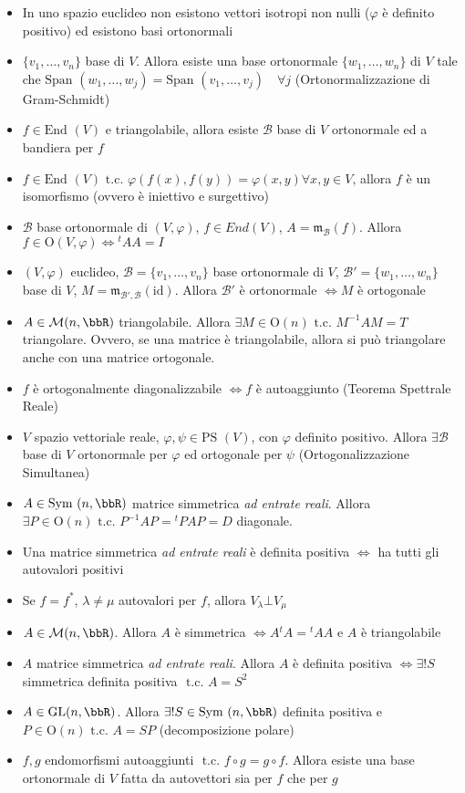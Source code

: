 \documentclass[a4paper,NoNotes]{stdmdoc}
\newcommand{\tc}{\mbox{ t.c. }}
\newcommand{\End}{\mbox{End }}
\newcommand{\GL}{\mbox{GL}}
\newcommand{\Ort}{\mbox{O}}
\newcommand{\Span}{\mbox{Span }}
\newcommand{\Symm}{\mbox{Sym }}
\newcommand{\Id}{\mbox{id}}
\newcommand{\PS}{\mbox{PS }}
\newcommand{\Mtr}{\mathfrak{m}}
\newcommand{\sse}{\Leftrightarrow}
\begin{document}
	\begin{itemize}
		\item In uno spazio euclideo non esistono vettori isotropi non nulli ($\varphi$ è definito positivo) ed esistono basi ortonormali
		\item $\{v_1, \ldots, v_n\}$ base di $V$. Allora esiste una base ortonormale $\{w_1, \ldots, w_n\}$ di $V$ tale che $\Span(w_1, \ldots, w_j) = \Span(v_1, \ldots, v_j) \quad \forall j$ (Ortonormalizzazione di Gram-Schmidt)
		\item $f \in \End(V)$ e triangolabile, allora esiste $\mathcal{B}$ base di $V$ ortonormale ed a bandiera per $f$
		\item $f \in \End(V) \tc \varphi(f(x), f(y)) = \varphi(x, y) \forall x, y \in V$, allora $f$ è un isomorfismo (ovvero è iniettivo e surgettivo)
		\item $\mathcal{B}$ base ortonormale di $(V, \varphi)$, $f \in End(V)$, $A = \Mtr_{\mathcal{B}}(f)$. Allora $f \in \Ort(V, \varphi) \sse {}^tA A = I$
		\item $(V, \varphi)$ euclideo, $\mathcal{B} = \{v_1, \ldots, v_n\}$ base ortonormale di $V$, $\mathcal{B'} = \{w_1, \ldots, w_n\}$ base di $V$, $M = \Mtr_{\mathcal{B'}, \mathcal{B}}(\Id)$. Allora $\mathcal{B'}$ è ortonormale $\sse M$ è ortogonale
		\item $A \in \mathcal{M}(n,\bbR)$ triangolabile. Allora $\exists M \in \Ort(n) \tc M^{-1}AM = T$ triangolare. Ovvero, se una matrice è triangolabile, allora si può triangolare anche con una matrice ortogonale.
		\item $f$ è ortogonalmente diagonalizzabile $\sse f$ è autoaggiunto (Teorema Spettrale Reale)
		\item $V$ spazio vettoriale reale, $\varphi, \psi \in \PS(V)$, con $\varphi$ definito positivo. Allora $\exists \mathcal{B}$ base di $V$ ortonormale per $\varphi$ ed ortogonale per $\psi$ (Ortogonalizzazione Simultanea)
		\item $A \in \Symm(n, \bbR)$ matrice simmetrica {\it ad entrate reali}. Allora $\exists P \in \Ort(n) \tc P^{-1}AP = {}^tPAP = D$ diagonale.
		\item Una matrice simmetrica {\it ad entrate reali} è definita positiva $\sse$ ha tutti gli autovalori positivi
		\item Se $f = f^{*}$, $\lambda \neq \mu$ autovalori per $f$, allora $V_\lambda \bot V_\mu$
		\item $A \in \mathcal{M}(n, \bbR)$. Allora $A$ è simmetrica $\sse A {}^tA = {}^tAA$ e $A$ è triangolabile
		\item $A$ matrice simmetrica {\it ad entrate reali}. Allora $A$ è definita positiva $\sse \exists ! S$ simmetrica definita positiva $\tc A = S^2$
		\item $A \in \GL(n, \bbR)$. Allora $\exists ! S \in \Symm(n, \bbR)$ definita positiva e $P \in \Ort(n) \tc A = SP$ (decomposizione polare)
		\item $f, g$ endomorfismi autoaggiunti $\tc f \circ g = g \circ f$. Allora esiste una base ortonormale di $V$ fatta da autovettori sia per $f$ che per $g$
	\end{itemize}
\end{document}
